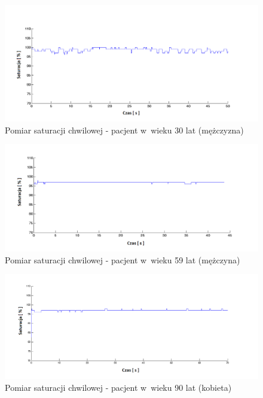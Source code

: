 \begin{figure}[!h]
	\centerline{\includegraphics[scale = 0.63]{graphic/Sat30M}}
	\caption{Pomiar saturacji chwilowej - pacjent w~wieku 30 lat (mężczyzna)}
	\label{rys:Sat30M}
\end{figure}
\newpage
\begin{figure}[!h]
	\centerline{\includegraphics[scale = 0.61]{graphic/Sat50M}}
	\caption{Pomiar saturacji chwilowej - pacjent w~wieku 59 lat (mężczyna)}
	\label{rys:Sat50M}
\end{figure}
\begin{figure}[!h]
	\centerline{\includegraphics[scale = 0.61]{graphic/Sat90}}
	\caption{Pomiar saturacji chwilowej - pacjent w~wieku 90 lat (kobieta)}
	\label{rys:Sat90}
\end{figure}

